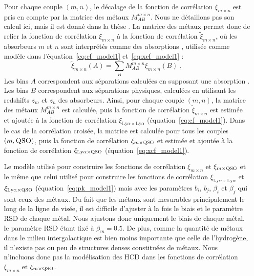 Pour chaque couple $(m, n)$, le décalage de la fonction de corrélation $\xi_{m\times n}$ est pris en compte par la matrice des métaux $M_{AB}^{m\times n}$.
Nous ne détaillons pas son calcul ici, mais il est donné dans la thèse \textcite{CITE:Victoria}. La matrice des métaux permet donc de relier la fonction de corrélation $\xi_{m\times n}$ à la fonction de corrélation $\tilde \xi_{m\times n}$, où les absorbeurs $m$ et $n$ sont interprétés comme des absorptions \lya{}, utilisée comme modèle dans l'équation~\ref{eq:cf_model1} et~\ref{eq:xcf_model1} :
\begin{equation}
  \tilde \xi_{m \times n}(A) = \sum_B M_{AB}^{m\times n} \xi_{m\times n}(B) \; ,
\end{equation}
Les bins $A$ correspondent aux séparations calculées en supposant une absorption \lya{}. Les bins $B$ correspondent aux séparations physiques, calculées en utilisant les redshifts $z_m$ et $z_n$ des absorbeurs.
Ainsi, pour chaque couple $(m, n)$, la matrice des métaux $M_{AB}^{m\times n}$ est calculée, puis la fonction de corrélation $\tilde \xi_{m \times n}$ est estimée et ajoutée à la fonction de corrélation $\xi_{\mathrm{Ly}\alpha\times\mathrm{Ly}\alpha}$ (équation~\ref{eq:cf_model1}).
Dans le cas de la corrélation croisée, la matrice est calculée pour tous les couples $(m, \textsc{QSO})$, puis la fonction de corrélation $\tilde \xi_{m \times \textsc{QSO}}$ et estimée et ajoutée à la fonction de corrélation $\xi_{\mathrm{Ly}\alpha\times\textsc{QSO}}$ (équation~\ref{eq:xcf_model1}).

Le modèle utilisé pour construire les fonctions de corrélation $\xi_{m\times n}$ et $\xi_{m\times \textsc{QSO}}$ et le même que celui utilisé pour construire les fonctions de corrélation $\xi_{\mathrm{Ly}\alpha\times\mathrm{Ly}\alpha}$ et $\xi_{\mathrm{Ly}\alpha\times\textsc{QSO}}$ (équation~\ref{eq:pk_model1}) mais avec les paramètres $b_i$, $b_j$, $\beta_i$ et $\beta_j$ qui sont ceux des métaux. Du fait que les métaux sont mesurables principalement le long de la ligne de visée, il est difficile d'ajuster à la fois le biais et le paramètre RSD de chaque métal. Nous ajustons donc uniquement le biais de chaque métal, le paramètre RSD étant fixé à $\beta_m = \num{0.5}$.
De plus, comme la quantité de métaux dans le milieu intergalactique est bien moins importante que celle de l'hydrogène, il n'existe pas ou peu de structures denses constituées de métaux. Nous n'incluons donc pas la modélisation des HCD dans les fonctions de corrélation $\xi_{m\times n}$ et $\xi_{m\times \textsc{QSO}}$.

